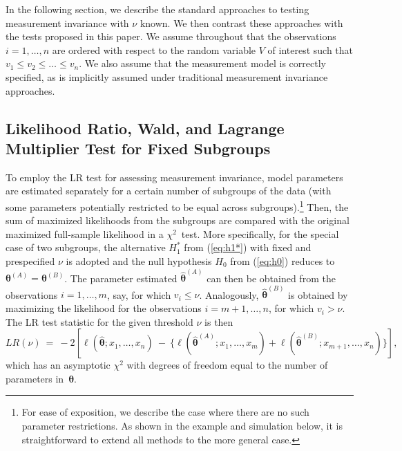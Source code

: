 \documentclass[man]{apa}
\begin{document}
In the following section, we describe the standard approaches to
testing measurement invariance with $\nu$ known.  We then contrast
these approaches with the tests proposed in this paper.
We assume throughout that the observations $i = 1, \dots, n$ are
ordered with respect to the random variable $V$ of interest such that
$v_1 \le v_2 \le \dots \le v_n$.  We also assume that the measurement
model is correctly specified, as is implicitly assumed under traditional
measurement invariance approaches.


\subsection{Likelihood Ratio, Wald, and Lagrange Multiplier Test for Fixed Subgroups}

To employ the LR test for assessing measurement invariance, model
parameters are estimated separately for a certain number of subgroups
of the data (with some parameters potentially restricted to be equal across
subgroups).\footnote{For ease of exposition, we describe
the case where there are no such parameter restrictions.  As shown in
the example and simulation below, it is
straightforward to extend all methods to the more general case.}
Then, the sum of maximized likelihoods 
from the subgroups are compared with the original maximized full-sample likelihood
in a $\chi^2$~test. More specifically, for the special case of two subgroups,
the alternative $H_1^*$ from (\ref{eq:h1*}) with fixed and prespecified $\nu$ is adopted
and the null hypothesis $H_0$ from (\ref{eq:h0}) reduces to ${\bm \theta}^{(A)} = {\bm \theta}^{(B)}$.
The parameter estimated $\hat {\bm \theta}^{(A)}$ can then be obtained from the
observations $i = 1, \dots, m$, say, for which $v_i \le \nu$. Analogously,
$\hat {\bm \theta}^{(B)}$ is obtained by maximizing the likelihood for the
observations $i = m + 1, \dots, n$, for which $v_i > \nu$. The LR test statistic
for the given threshold $\nu$ is then
\begin{equation} \label{eq:lr}
  \mathit{LR}(\nu) ~=~ -2 \left[
         \ell(\hat {\bm \theta}; x_1, \dots, x_n)
   ~-~ \{\ell(\hat {\bm \theta}^{(A)}; x_1, \dots, x_m)
    +    \ell(\hat {\bm \theta}^{(B)}; x_{m+1}, \dots, x_n)\}
    \right],
\end{equation}
which has an asymptotic $\chi^2$ with degrees of freedom equal to the number
of parameters in~${\bm \theta}$.
\end{document}
